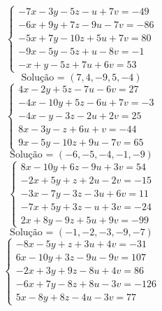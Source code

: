 \documentclass[12pt,oneside,a4paper,fleqn]{article}
\begin{document}
\begin{multicols*}{2}
\begin{equation*}
\begin{cases}
-7x-3y-5z-u+7v=-49 \\
-6x+9y+7z-9u-7v=-86 \\
-5x+7y-10z+5u+7v=80 \\
-9x-5y-5z+u-8v=-1 \\
-x+y-5z+7u+6v=53
\end{cases}
\end{equation*}
\begin{equation*}
\text{Solução = }\left(7,4,-9,5,-4\right)
\end{equation*}
\vspace{\baselineskip}
\begin{equation*}
\begin{cases}
4x-2y+5z-7u-6v=27 \\
-4x-10y+5z-6u+7v=-3 \\
-4x-y-3z-2u+2v=25 \\
8x-3y-z+6u+v=-44 \\
9x-5y-10z+9u-7v=65
\end{cases}
\end{equation*}
\begin{equation*}
\text{Solução = }\left(-6,-5,-4,-1,-9\right)
\end{equation*}
\vspace{\baselineskip}
\begin{equation*}
\begin{cases}
8x-10y+6z-9u+3v=54 \\
-2x+5y+z+2u-2v=-15 \\
-3x-7y-3z-3u+6v=11 \\
-7x+5y+3z-u+3v=-24 \\
2x+8y-9z+5u+9v=-99
\end{cases}
\end{equation*}
\begin{equation*}
\text{Solução = }\left(-1,-2,-3,-9,-7\right)
\end{equation*}
\vspace{\baselineskip}
\begin{equation*}
\begin{cases}
-8x-5y+z+3u+4v=-31 \\
6x-10y+3z-9u-9v=107 \\
-2x+3y+9z-8u+4v=86 \\
-6x+7y-8z+8u-3v=-126 \\
5x-8y+8z-4u-3v=77
\end{cases}
\end{equation*}
\begin{equation*}

\end{equation*}
\end{multicols*}
\end{document}
